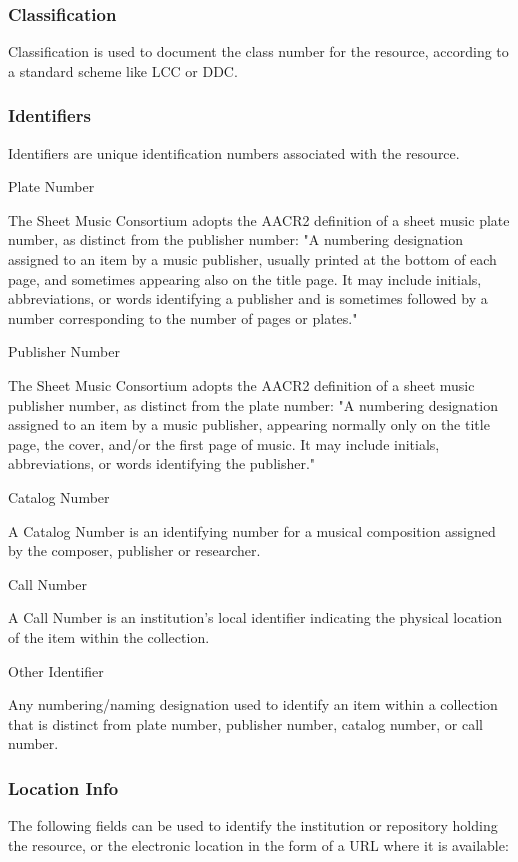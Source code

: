 \documentclass[12pt,a4paper]{scrreprt}
\begin{document}
\subsubsection{Classification}
Classification is used to document the class number for the resource, according to a standard scheme like LCC or DDC.

\subsubsection{Identifiers}
Identifiers are unique identification numbers associated with the resource.


Plate Number

The Sheet Music Consortium adopts the AACR2 definition of a sheet music plate number, as distinct from the publisher number: "A numbering designation assigned to an item by a music publisher, usually printed at the bottom of each page, and sometimes appearing also on the title page. It may include initials, abbreviations, or words identifying a publisher and is sometimes followed by a number corresponding to the number of pages or plates."

Publisher Number

The Sheet Music Consortium adopts the AACR2 definition of a sheet music publisher number, as distinct from the plate number: "A numbering designation assigned to an item by a music publisher, appearing normally only on the title page, the cover, and/or the first page of music. It may include initials, abbreviations, or words identifying the publisher."

Catalog Number

A Catalog Number is an identifying number for a musical composition assigned by the composer, publisher or researcher.

Call Number

A Call Number is an institution's local identifier indicating the physical location of the item within the collection.

Other Identifier

Any numbering/naming designation used to identify an item within a collection that is distinct from plate number, publisher number, catalog number, or call number.

\subsubsection{Location Info}
The following fields can be used to identify the institution or repository holding the resource, or the electronic location in the form of a URL where it is available:
\end{document}
